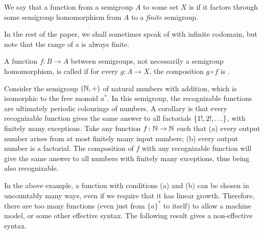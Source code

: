 \begin{definition}
  We say that a function from a semigroup $A$ to some set $X$ is
   if it factors through some semigroup homomorphism from $A$
  to a \emph{finite} semigroup.
\end{definition}
In the rest of the paper, we shall sometimes
speak of  with infinite codomain, but note that the
range of a  is always finite.

\AP A function $f\colon B \to A$ between semigroups, not necessarily a semigroup
homomorphism, is called  if for every
 $g\colon A \to X$, the composition $g \circ f$ is
.

\begin{example}
  Consider the semigroup $({\mathbb N}, +)$ of natural numbers with addition, which is isomorphic to the free monoid $a^*$. In this semigroup, the recognizable functions are ultimately periodic colourings of numbers. A corollary is that every recognizable function gives the same answer to all factorials $\{1!,2!,\ldots\}$, with finitely many exceptions. Take any function $f\colon {\mathbb N} \to {\mathbb N}$ such that (a) every output number arises from at most finitely many input numbers; (b) every output number is a factorial. The composition of $f$ with any recognizable function will give the same answer to all numbers with finitely many exceptions, thus being also recognizable.
\end{example}

In the above example, a function with conditions (a) and (b) can be chosen in uncountably many ways, even if we require that it has linear growth.
Therefore, there are too many  functions (even
just from $\{a\}^*$ to itself) to
allow a machine model, or some other effective syntax. The following result
gives a non-effective syntax.

